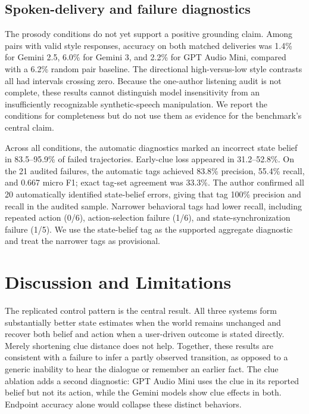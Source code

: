 \documentclass{article}
\begin{document}
\subsection{Spoken-delivery and failure diagnostics}

The prosody conditions do not yet support a positive grounding claim. Among pairs with valid style responses, accuracy on both matched deliveries was 1.4\% for Gemini 2.5, 6.0\% for Gemini 3, and 2.2\% for GPT Audio Mini, compared with a 6.2\% random pair baseline. The directional high-versus-low style contrasts all had intervals crossing zero. Because the one-author listening audit is not complete, these results cannot distinguish model insensitivity from an insufficiently recognizable synthetic-speech manipulation. We report the conditions for completeness but do not use them as evidence for the benchmark's central claim.

Across all conditions, the automatic diagnostics marked an incorrect state belief in 83.5--95.9\% of failed trajectories. Early-clue loss appeared in 31.2--52.8\%. On the 21 audited failures, the automatic tags achieved 83.8\% precision, 55.4\% recall, and 0.667 micro F1; exact tag-set agreement was 33.3\%. The author confirmed all 20 automatically identified state-belief errors, giving that tag 100\% precision and recall in the audited sample. Narrower behavioral tags had lower recall, including repeated action (0/6), action-selection failure (1/6), and state-synchronization failure (1/5). We use the state-belief tag as the supported aggregate diagnostic and treat the narrower tags as provisional.

\FloatBarrier
\section{Discussion and Limitations}

The replicated control pattern is the central result. All three systems form substantially better state estimates when the world remains unchanged and recover both belief and action when a user-driven outcome is stated directly. Merely shortening clue distance does not help. Together, these results are consistent with a failure to infer a partly observed transition, as opposed to a generic inability to hear the dialogue or remember an earlier fact. The clue ablation adds a second diagnostic: GPT Audio Mini uses the clue in its reported belief but not its action, while the Gemini models show clue effects in both. Endpoint accuracy alone would collapse these distinct behaviors.
\end{document}

